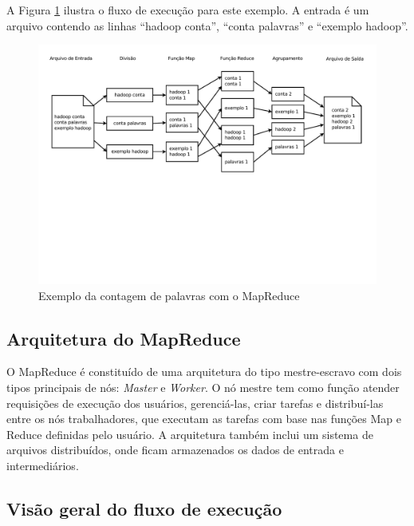 A Figura \ref{fig:MapReduceexemplo} ilustra o fluxo de execução para este exemplo. A entrada é um arquivo contendo as linhas ``hadoop conta'', ``conta palavras'' e ``exemplo hadoop''.

\begin{figure}[!h]
\centering
\includegraphics[trim=0cm 9cm 0cm 0cm, width=\textwidth]{figuras/MapReduceExemplo.pdf}
\caption{Exemplo da contagem de palavras com o MapReduce}
\label{fig:MapReduceexemplo}
\end{figure}

\subsection{Arquitetura do MapReduce}
O MapReduce é constituído de uma arquitetura do tipo mestre-escravo com dois tipos principais de nós: \textit{Master} e \textit{Worker}. O nó mestre tem como função atender requisições de execução dos usuários, gerenciá-las, criar tarefas e distribuí-las entre os nós trabalhadores, que executam as tarefas com base nas funções Map e Reduce definidas pelo usuário.
A arquitetura também inclui um sistema de arquivos distribuídos, onde ficam armazenados os dados de entrada e intermediários.



\subsection{Visão geral do fluxo de execução}


